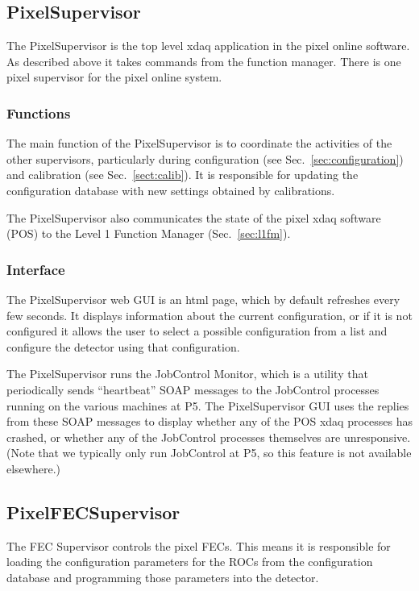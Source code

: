 \subsection{PixelSupervisor}

The PixelSupervisor is the top level xdaq application
in the pixel online software. As described above it takes
commands from the function manager. There is one pixel
supervisor for the pixel online system.

\subsubsection{Functions}

The main function of the PixelSupervisor is to coordinate the
activities of the other supervisors, particularly during configuration
(see Sec.~\ref{sec:configuration}) and calibration (see
Sec.~\ref{sect:calib}). It is responsible for updating the
configuration database with new settings obtained by calibrations.

The PixelSupervisor also communicates the state of the pixel
xdaq software (POS) to the Level 1 Function Manager (Sec.~\ref{sec:l1fm}).

\subsubsection{Interface}
The PixelSupervisor web GUI is an html page, which by default
refreshes every few seconds. It displays information about the current
configuration, or if it is not configured it allows the user to select
a possible configuration from a list and configure the detector using
that configuration.

The PixelSupervisor runs the JobControl Monitor, which is a utility
that periodically sends ``heartbeat'' SOAP messages to the JobControl
processes running on the various machines at P5. The PixelSupervisor
GUI uses the replies from these SOAP messages to display whether any of
the POS xdaq processes has crashed, or whether any of the JobControl
processes themselves are unresponsive. (Note that we typically only
run JobControl at P5, so this feature is not available elsewhere.)

\subsection{PixelFECSupervisor}

The FEC Supervisor controls the pixel FECs. This means it is
responsible for loading the configuration parameters for the ROCs from
the configuration database and programming those parameters into the
detector.

